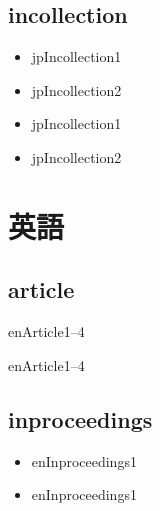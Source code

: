 \documentclass[10pt, a4paper]{jsarticle}
\newcommand{\putlst}[1]{
  \noindent\makebox[\linewidth]{\rule{\linewidth}{0.4pt}}\vspace{-1.5zw}
  \vspace{-1.8zw}
  \noindent\makebox[\linewidth]{\rule{\linewidth}{0.4pt}}\vspace{0.5zw}\par
}
\begin{document}
\subsection{incollection}

\putlst{bib/jpincollection.bib}

\begin{bibunit}[IEEJtran]
  \begin{itemize}
    \item jpIncollection1 \cite{jpIncollection1}
    \item jpIncollection2 \cite{jpIncollection2}
  \end{itemize}
  {\small {}}
\end{bibunit}
\begin{bibunit}[jIEEEtran]
  \begin{itemize}
    \item jpIncollection1 \cite{jpIncollection1}
    \item jpIncollection2 \cite{jpIncollection2}
  \end{itemize}
  {\small {}}
\end{bibunit}

\clearpage
\section{英語}

\subsection{article}

\putlst{bib/enarticle.bib}

\begin{bibunit}[IEEJtran]
  enArticle1--4\cite{enArticle1,enArticle2,enArticle3,enArticle4}
  {\small {}}
\end{bibunit}
\begin{bibunit}[jIEEEtran]
  enArticle1--4\cite{enArticle1,enArticle2,enArticle3,enArticle4}
  {\small {}}
\end{bibunit}


\subsection{inproceedings}

\putlst{bib/eninproceedings.bib}

\begin{bibunit}[IEEJtran]
  \begin{itemize}
    \item enInproceedings1 \cite{enInproceedings1}
  \end{itemize}
  {\small {}}
\end{bibunit}
\begin{bibunit}[jIEEEtran]
  \begin{itemize}
    \item enInproceedings1 \cite{enInproceedings1}
  \end{itemize}
  {\small {}}
\end{bibunit}
\end{document}
